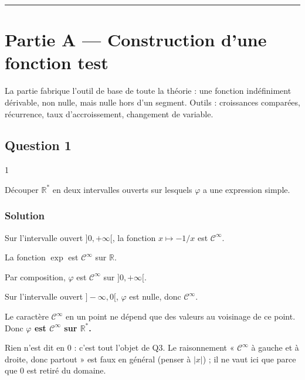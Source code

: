 \documentclass[11pt,a4paper]{article}
\begin{document}
\begin{center}\rule{0.5\linewidth}{0.5pt}\end{center}

\hypertarget{partie-a-construction-dune-fonction-test}{%
\section{Partie A --- Construction d'une fonction test}\label{partie-a-construction-dune-fonction-test}}

La partie fabrique l'outil de base de toute la théorie : une fonction indéfiniment dérivable, non nulle, mais nulle hors d'un segment. Outils : croissances comparées, récurrence, taux d'accroissement, changement de variable.

\hypertarget{question-1}{%
\subsection{Question 1}\label{question-1}}

\begin{indication}{1}

Découper \(\mathbb R^*\) en deux intervalles ouverts sur lesquels \(\varphi\) a une expression simple.

\end{indication}

\hypertarget{solution}{%
\subsubsection{Solution}\label{solution}}

Sur l'intervalle ouvert \(]0,+\infty[\), la fonction \(x\mapsto-1/x\) est \(\mathcal C^\infty\).

La fonction \(\exp\) est \(\mathcal C^\infty\) sur \(\mathbb R\).

Par composition, \(\varphi\) est \(\mathcal C^\infty\) sur \(]0,+\infty[\).

Sur l'intervalle ouvert \(]-\infty,0[\), \(\varphi\) est nulle, donc \(\mathcal C^\infty\).

Le caractère \(\mathcal C^\infty\) en un point ne dépend que des valeurs au voisinage de ce point. Donc \textbf{\(\varphi\) est \(\mathcal C^\infty\) sur \(\mathbb R^*\).}

\begin{piege}

Rien n'est dit en \(0\) : c'est tout l'objet de Q3. Le raisonnement « \(\mathcal C^\infty\) à gauche et à droite, donc partout » est faux en général (penser à \(|x|\)) ; il ne vaut ici que parce que \(0\) est retiré du domaine.

\end{piege}
\end{document}
